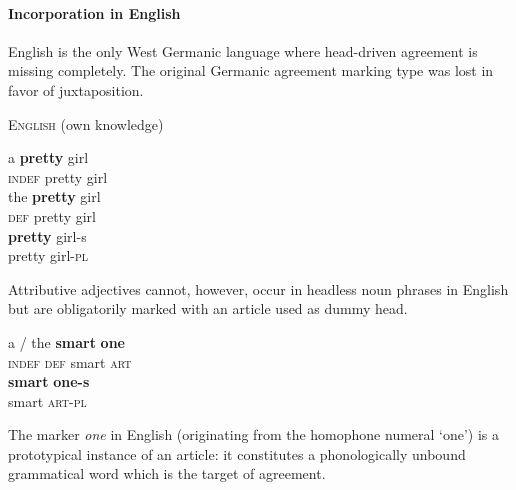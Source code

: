 \paragraph{Incorporation in English}
English is the only West Germanic language where head-driven agreement is missing completely. The original Germanic agreement marking type was lost in favor of juxtaposition. 
\begin{exe}
\ex \textsc{English} (own knowledge)
\begin{xlist}
\ex 
\gll	a \textbf{pretty} girl\\
	\textsc{indef} pretty girl\\
\ex
\gll	the \textbf{pretty} girl\\
	\textsc{def} pretty girl\\
\ex 
\gll	\textbf{pretty} girl-s\\
	pretty girl-\textsc{pl}\\
\end{xlist}
\end{exe}
Attributive adjectives cannot, however, occur in headless noun phrases in English but are obligatorily marked with an article used as dummy head.
\begin{exe}
\ex
\begin{xlist}
\ex
\gll	a / the \textbf{smart} \textbf{one}\\
	\textsc{indef} {} \textsc{def} smart \textsc{art}\\
\ex	
\gll	\textbf{smart} \textbf{one-s}\\
	smart \textsc{art}-\textsc{pl}\\
\end{xlist}
\end{exe}
The marker \textit{one} in English (originating from the homophone numeral ‘one’) is a prototypical instance of an article: it constitutes a phonologically unbound grammatical word which is the target of agreement. 


